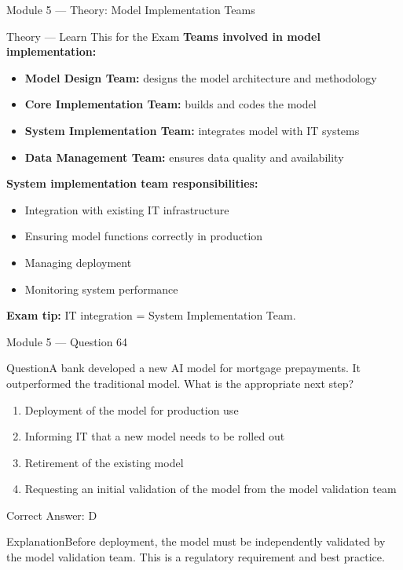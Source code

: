 \documentclass[aspectratio=169,10pt]{beamer}
\newcommand{\question}[1]{\begin{block}{Question}#1\end{block}}
\newcommand{\options}[4]{%
	\begin{enumerate}[label=\Alph*.,leftmargin=*]
		\item #1
		\item #2
		\item #3
		\item #4
	\end{enumerate}
}
\newcommand{\answerbox}[1]{\begin{exampleblock}{Correct Answer: #1}\end{exampleblock}}
\newcommand{\explain}[1]{\begin{block}{Explanation}#1\end{block}}
\newcommand{\theory}[1]{%
	\begin{block}{Theory --- Learn This for the Exam}
		\small #1
	\end{block}
}
\begin{document}
	\begin{frame}{Module 5 --- Theory: Model Implementation Teams}
		\theory{
			\textbf{Teams involved in model implementation:}
			\begin{itemize}
				\item \textbf{Model Design Team:} designs the model architecture and methodology
				\item \textbf{Core Implementation Team:} builds and codes the model
				\item \textbf{System Implementation Team:} integrates model with IT systems
				\item \textbf{Data Management Team:} ensures data quality and availability
			\end{itemize}
			\textbf{System implementation team responsibilities:}
			\begin{itemize}
				\item Integration with existing IT infrastructure
				\item Ensuring model functions correctly in production
				\item Managing deployment
				\item Monitoring system performance
			\end{itemize}
			\textbf{Exam tip:} IT integration = System Implementation Team.
		}
	\end{frame}
	
	\begin{frame}{Module 5 --- Question 64}
		\question{A bank developed a new AI model for mortgage prepayments. It outperformed the traditional model. What is the appropriate next step?}
		\options{Deployment of the model for production use}{Informing IT that a new model needs to be rolled out}{Retirement of the existing model}{Requesting an initial validation of the model from the model validation team}
		\answerbox{D}
		\explain{Before deployment, the model must be independently validated by the model validation team. This is a regulatory requirement and best practice.}
	\end{frame}
	
\end{document}
